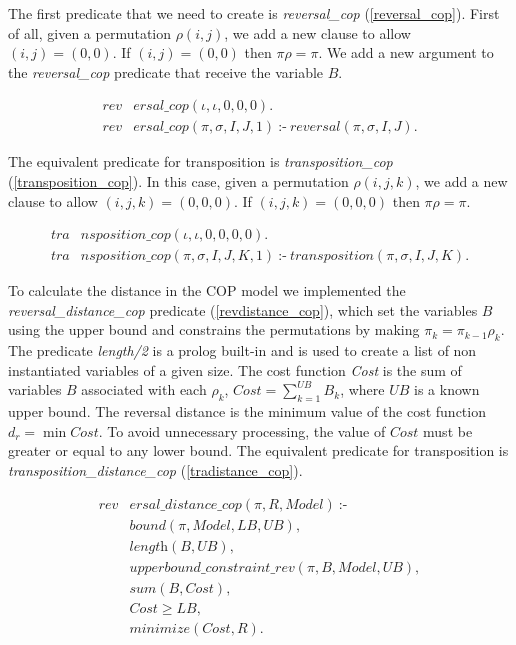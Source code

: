 The first predicate that we need to create is \textit{reversal\_cop}
(\ref{reversal_cop}).  First of all, given a permutation $\rho(i, j)$,
we add a new clause to allow $(i, j) = (0, 0)$. If $(i, j) = (0, 0)$
then $\pi\rho = \pi$. We add a new argument to the
\textit{reversal\_cop} predicate that receive the variable $B$.

\begin{align}
  \label{reversal_cop}
  \textit{rev}&\textit{ersal\_cop}(\iota, \iota, 0, 0, 0). \\
  \textit{rev}&\textit{ersal\_cop}(\pi, \sigma, I, J, 1)~\text{:-}~ 
  \textit{reversal}(\pi, \sigma, I, J). \nonumber
\end{align}

The equivalent predicate for transposition is
\textit{transposition\_cop} (\ref{transposition_cop}). In this case,
given a permutation $\rho(i, j, k)$, we add a new clause to allow $(i,
j, k) = (0, 0, 0)$. If $(i, j, k) = (0, 0, 0)$ then $\pi\rho = \pi$.

\begin{align}
  \label{transposition_cop}
  \textit{tra}&\textit{nsposition\_cop}(\iota, \iota, 0, 0, 0, 0). \\
  \textit{tra}&\textit{nsposition\_cop}(\pi, \sigma, I, J, K, 1)~\text{:-}~ 
  \textit{transposition}(\pi, \sigma, I, J, K). \nonumber
\end{align}

To calculate the distance in the COP model we implemented the
\textit{reversal\_distance\_cop} predicate (\ref{revdistance_cop}),
which set the variables $B$ using the upper bound and constrains the
permutations by making $\pi_{k} = \pi_{k-1} \rho_{k}$. The predicate
\textit{length/2} is a prolog built-in and is used to create a list of
non instantiated variables of a given size. The cost function
\textit{Cost} is the sum of variables $B$ associated with each
$\rho_{k}$, $Cost = \sum_{k=1}^{UB} B_{k}$, where $UB$ is a known
upper bound. The reversal distance is the minimum value of the cost
function $d_{r} = \min Cost$. To avoid unnecessary processing, the
value of $Cost$ must be greater or equal to any lower bound. The
equivalent predicate for transposition is
\textit{transposition\_distance\_cop} (\ref{tradistance_cop}).

\begin{align}
  \label{revdistance_cop}
  \textit{rev}&\textit{ersal\_distance\_cop}(\pi, R, Model)~\text{:-} \nonumber\\
  &\textit{bound}(\pi, Model, LB, UB), \nonumber\\
  &\textit{length}(B, UB), \nonumber \\
  &\textit{upperbound\_constraint\_rev}(\pi, B, Model, UB), \\
  &\textit{sum}(B, Cost), \nonumber \\
  &\textit{Cost} \ge \textit{LB}, \nonumber \\
  &\textit{minimize}(Cost, R). \nonumber
\end{align}

